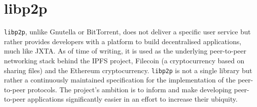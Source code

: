 





\section{libp2p}
\label{sec:libp2p}

\verb+libp2p+, unlike Gnutella or BitTorrent, does not deliver a specific user service but rather provides developers with a platform to build decentralised applications, much like JXTA. As of time of writing, it is used as the underlying peer-to-peer networking stack behind the IPFS project, Filecoin (a cryptocurrency based on sharing files) and the Ethereum cryptocurrency. \verb+libp2p+ is not a single library but rather a continuously maintained specification for the implementation of the peer-to-peer protocols. The project's ambition is to inform and make developing peer-to-peer applications significantly easier in an effort to increase their ubiquity\cite{dias2018IntroLibp2p}.

